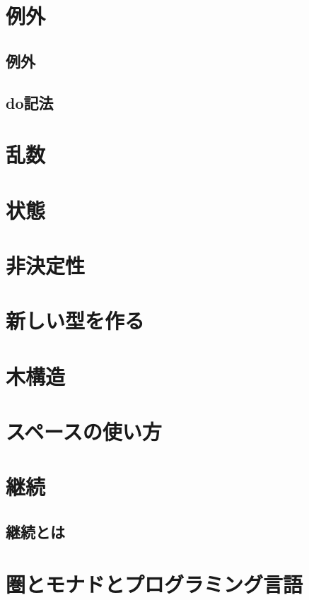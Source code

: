 \documentclass[a5paper,draft]{jsbook}
\begin{document}
\chapter{例外}

\section{例外}

\section{do記法}

\chapter{乱数}

\chapter{状態}

\chapter{非決定性}

\chapter{新しい型を作る}

\chapter{木構造}

\chapter{スペースの使い方}

\chapter{継続}

\section{継続とは}


\chapter{圏とモナドとプログラミング言語}
\end{document}
